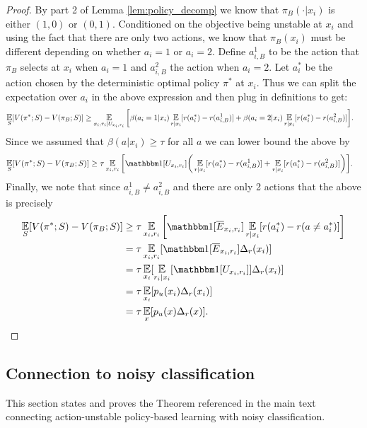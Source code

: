\begin{proof}
By part 2 of Lemma \ref{lem:policy_decomp} we know that $ \pi_B(\cdot|x_i) $ is either $ (1,0)$ or $ (0,1)$. Conditioned on the objective being unstable at $ x_i$ and using the fact that there are only two actions, we know that $ \pi_B(x_i)$ must be different depending on whether $ a_i = 1$ or $ a_i = 2$. Define $ a_{i,B}^1$ to be the action that $ \pi_B$ selects at $ x_i $ when $ a_i = 1$ and $ a_{i,B}^2$ the action when $ a_i = 2$.
Let $ a_i^*$ be the action chosen by the deterministic optimal policy $ \pi^*$ at $ x_i$.
Thus we can split the expectation over $ a_i$ in the above expression and then plug in definitions to get:
\begin{align*}
    \E_{S}[V(\pi^*;S) - V(\pi_B;S)] &\geq \E_{x_i, r_i |U_{x_i, r_i}} \bigg[\beta(a_i = 1|x_i) \E_{r|x_i}[r(a^*_i) - r(a_{i,B}^1)] + \beta(a_i = 2|x_i) \E_{r|x_i}[r(a^*_i) - r(a_{i,B}^2)]\bigg].
\end{align*}
Since we assumed that $ \beta (a|x_i) \geq \tau$ for all $ a$ we can lower bound the above by
\begin{align*}
    \E_{S}[V(\pi^*;S) - V(\pi_B;S)] &\geq \tau \E_{x_i, r_i} \bigg[\one[U_{x_i, r_i}]\bigg( \E_{r|x_i}[r(a_i^*) - r(a_{i,B}^1)] +  \E_{r|x_i}[r(a_i^*) - r(a_{i,B}^2)]\bigg)\bigg].
\end{align*}
Finally, we note that since $ a_{i,B}^1 \neq a_{i,B}^2$ and there are only 2 actions that the above is precisely
\begin{align*}
    \E_{S}[V(\pi^*;S) - V(\pi_B;S)] &\geq  \tau \E_{x_i, r_i} \bigg[\one[\overline E_{x_i, r_i}] \E_{r|x_i}[r(a_i^*) - r(a \neq a^*_i)]\bigg]\\
    &= \tau \E_{x_i, r_i} [\one[\overline E_{x_i, r_i}] \Delta_r(x_i)]\\
    &= \tau \E_{x_i} [\E_{r_i|x_i}[\one[U_{x_i, r_i}]] \Delta_r(x_i)]\\
    &= \tau \E_{x_i} [p_u(x_i) \Delta_r(x_i)]\\
    &= \tau \E_{x} [p_u(x) \Delta_r(x)].
\end{align*}
\end{proof}



\subsection{Connection to noisy classification}\label{app:noisy}

This section states and proves the Theorem referenced in the main text connecting action-unstable policy-based learning with noisy classification.

